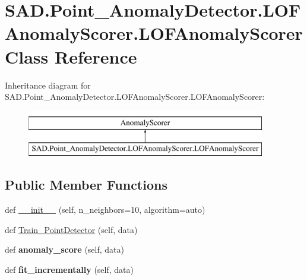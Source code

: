 \hypertarget{classSAD_1_1Point__AnomalyDetector_1_1LOFAnomalyScorer_1_1LOFAnomalyScorer}{}\section{S\+A\+D.\+Point\+\_\+\+Anomaly\+Detector.\+L\+O\+F\+Anomaly\+Scorer.\+L\+O\+F\+Anomaly\+Scorer Class Reference}
\label{classSAD_1_1Point__AnomalyDetector_1_1LOFAnomalyScorer_1_1LOFAnomalyScorer}
Inheritance diagram for S\+A\+D.\+Point\+\_\+\+Anomaly\+Detector.\+L\+O\+F\+Anomaly\+Scorer.\+L\+O\+F\+Anomaly\+Scorer\+:\begin{figure}[H]
\begin{center}
\leavevmode
\includegraphics[height=2.000000cm]{classSAD_1_1Point__AnomalyDetector_1_1LOFAnomalyScorer_1_1LOFAnomalyScorer}
\end{center}
\end{figure}
\subsection*{Public Member Functions}
\begin{DoxyCompactItemize}
\item 
def \hyperlink{classSAD_1_1Point__AnomalyDetector_1_1LOFAnomalyScorer_1_1LOFAnomalyScorer_a901c20153f333b511bcfae6fb1c997a3}{\+\_\+\+\_\+init\+\_\+\+\_\+} (self, n\+\_\+neighbors=10, algorithm=\textquotesingle{}auto\textquotesingle{})
\item 
def \hyperlink{classSAD_1_1Point__AnomalyDetector_1_1LOFAnomalyScorer_1_1LOFAnomalyScorer_a1d4a77f8866cca6ed19db1f92ae13fd0}{Train\+\_\+\+Point\+Detector} (self, data)
\item 
def {\bfseries anomaly\+\_\+score} (self, data)\hypertarget{classSAD_1_1Point__AnomalyDetector_1_1LOFAnomalyScorer_1_1LOFAnomalyScorer_ad67e6c6a4abc10b5d9bfe54c066e94e4}{}\label{classSAD_1_1Point__AnomalyDetector_1_1LOFAnomalyScorer_1_1LOFAnomalyScorer_ad67e6c6a4abc10b5d9bfe54c066e94e4}

\item 
def {\bfseries fit\+\_\+incrementally} (self, data)\hypertarget{classSAD_1_1Point__AnomalyDetector_1_1LOFAnomalyScorer_1_1LOFAnomalyScorer_a09c724739e45504942bc135104077cc6}{}\label{classSAD_1_1Point__AnomalyDetector_1_1LOFAnomalyScorer_1_1LOFAnomalyScorer_a09c724739e45504942bc135104077cc6}

\end{DoxyCompactItemize}
